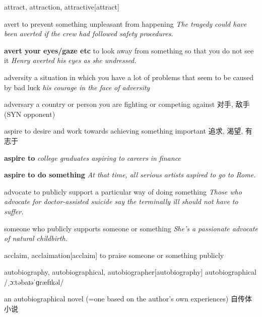 \begin{DefWord}{attract, attraction, attractive}[attract]
\end{DefWord}

\begin{DefWord}{avert}
    to prevent something unpleasant from happening
    \textit{The tragedy could have been averted if the crew had followed safety procedures.}

    \textbf{avert your eyes/gaze etc} 
    to look away from something so that you do not see it
    \textit{Henry averted his eyes as she undressed.}

\end{DefWord}

\begin{DefWord}{adversity}
    a situation in which you have a lot of problems that seem to be caused by bad luck
    \textit{his courage in the face of adversity}
\end{DefWord}

\begin{DefWord}{adversary}
    a country or person you are fighting or competing against 对手, 敌手 (SYN opponent)
\end{DefWord}

\begin{DefWord}{aspire}
    to desire and work towards achieving something important
    追求, 渴望, 有志于

    \textbf{aspire to}
    \textit{college graduates aspiring to careers in finance}

    \textbf{aspire to do something}
    \textit{At that time, all serious artists aspired to go to Rome.}
\end{DefWord}

\begin{DefWord}{advocate}
    to publicly support a particular way of doing something
    \textit{Those who advocate for doctor-assisted suicide say the terminally ill should not have to suffer.}

    someone who publicly supports someone or something
    \textit{She's a passionate advocate of natural childbirth.}
\end{DefWord}

\begin{DefWord}{acclaim, acclaimation}[acclaim]
    to praise someone or something publicly
\end{DefWord}

\begin{DefWord}{autobiography, autobiographical, autobiographer}[autobiography]
    autobiographical /ˌɔːtəbaɪəˈɡræfɪkəl/

    an autobiographical novel (=one based on the author's own experiences) 自传体小说
\end{DefWord}

